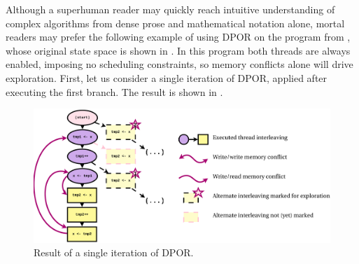 Although a superhuman reader may quickly reach intuitive understanding
of complex algorithms from dense prose and mathematical notation alone,
mortal readers may prefer the following example of using DPOR on the program from ,
whose original state space is shown in .
In this program both threads are always enabled, imposing no scheduling constraints,
so memory conflicts alone will drive exploration.
First, let us consider a single iteration of DPOR, applied after executing the first branch.
The result is shown in .

\begin{figure}[h]
	\begin{center}
		\includegraphics[width=\textwidth]{dpor-example-0.pdf}
	\end{center}
	\caption{Result of a single iteration of DPOR.}
	\label{fig:dpor-example-0}
\end{figure}

\newcommand\dporTA[1]{\hilight{darklavender}{#1}\xspace}
\newcommand\dporTB[1]{\hilight{goldish}     {#1}\xspace}
\newcommand\dporTAcode[1]{\dporTA{\ensuremath{\mathbf{T_1}}: {\tt #1}}\xspace}
\newcommand\dporTBcode[1]{\dporTB{\ensuremath{\mathbf{T_2}}: {\tt #1}}\xspace}

